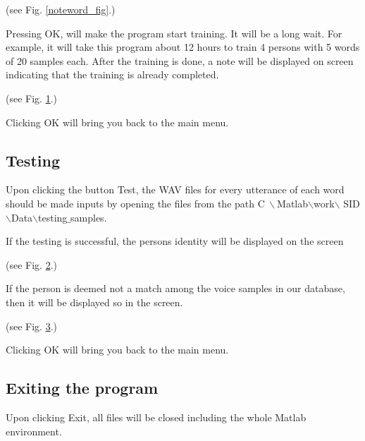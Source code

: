     (see Fig. \ref{noteword_fig}.)

    Pressing OK, will make the program start training. It will be a long
    wait. For example, it will take this program about 12 hours to
    train 4 persons with 5 words of 20 samples each. After the
    training is done, a note will be displayed on screen
    indicating that the training is already completed.

    \begin{figure}[h]
    \begin{center}
     \caption{\label{succtrain_fig}}
    \end{center}
    \end{figure}

    (see Fig. \ref{succtrain_fig}.)

       Clicking OK will bring you back to the main menu.

\subsection{Testing}
Upon clicking the button Test, the WAV files for every
    utterance of each word should be made inputs by opening the files
    from the path C$\: \backslash$Matlab$\backslash$work$\backslash$
    SID$\backslash$Data$\backslash$testing$\_$samples.

If the testing is successful, the persons identity will be
    displayed on the screen

    \begin{figure}[h]
    \begin{center}
     \caption{\label{ident_fig}}
    \end{center}
    \end{figure}

    (see Fig. \ref{ident_fig}.)

If the person is deemed not a match among the voice samples in
    our database, then it will be displayed so in the
    screen.

\begin{figure}[h]
    \begin{center}
     \caption{\label{identnot_fig}}
    \end{center}
    \end{figure}

    (see Fig. \ref{identnot_fig}.)

    Clicking OK will bring you back to the main menu.

\subsection{Exiting the program}
    Upon clicking Exit, all files will be closed including the
    whole Matlab environment.
